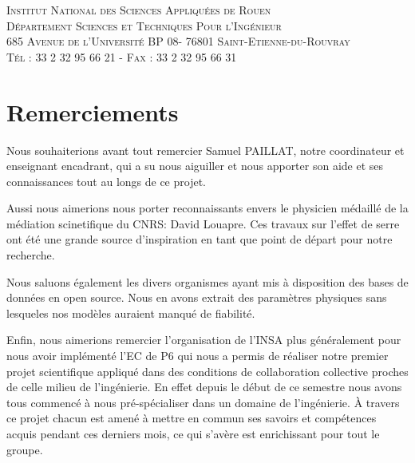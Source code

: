 \documentclass[a4paper, 12pt]{report} %
\begin{document}

\begin{center}
	\scshape Institut National des Sciences Appliquées de Rouen \\
	Département Sciences et Techniques Pour l'Ingénieur \\
	685 Avenue de l'Université BP 08- 76801 Saint-Etienne-du-Rouvray \\ Tél : 33 2 32 95 66 21 - Fax : 33 2 32 95 66 31
\end{center}


\newpage
\chapter*{Remerciements} %

\setlength{\parindent}{30pt}
Nous souhaiterions avant tout remercier Samuel PAILLAT, notre
coordinateur et enseignant encadrant, qui a su nous aiguiller
et nous apporter son aide et ses connaissances tout au longs
de ce projet.

	Aussi nous aimerions nous porter reconnaissants 
envers le physicien médaillé de la médiation scinetifique
du CNRS: David Louapre. Ces travaux sur l'effet de serre 
ont été une grande source d'inspiration en tant que point
de départ pour notre recherche. \vspace{\baselineskip}

\indent Nous saluons également les divers organismes ayant 
mis à disposition des bases de données en open source. Nous
en avons extrait des paramètres physiques sans lesqueles 
nos modèles auraient manqué de fiabilité. \vspace{\baselineskip}

\indent Enfin, nous aimerions remercier l'organisation de 
l'INSA plus généralement pour nous avoir implémenté l'EC de P6
qui nous a permis de réaliser notre premier projet
scientifique appliqué dans des conditions de collaboration
collective proches de celle milieu de l'ingénierie. 
En effet depuis le début de ce semestre nous avons tous commencé à 
nous pré-spécialiser dans un domaine de l'ingénierie. À travers 
ce projet chacun est amené à mettre en commun ses savoirs et 
compétences acquis pendant ces derniers mois, ce qui s'avère est 
enrichissant pour tout le groupe.
\end{document}
